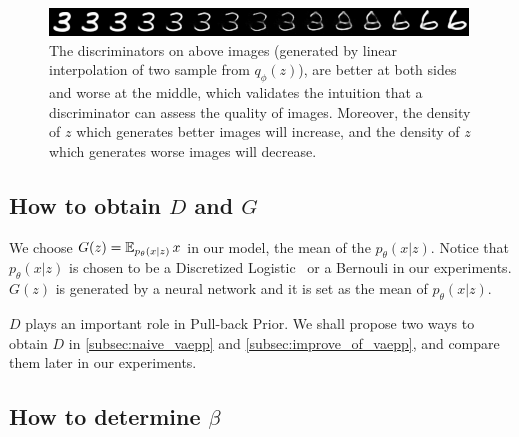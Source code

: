 \begin{figure}[tb]
	\centering
	\includegraphics[width=0.9\columnwidth]{../figures/interpolate}
	\caption{
	The discriminators on above images (generated by linear interpolation of two sample from $q_\phi(z)$), are better at both sides and worse at the middle, which validates the intuition that a discriminator can assess the quality of images. Moreover, the density of $z$ which generates better images will increase, and the density of $z$ which generates worse images will decrease. 
	}
	\label{fig:interpolate}
\end{figure}

\subsection{How to obtain $D$ and $G$}\label{subsec:determine_D_and_G}
We choose $G(z) = \operatorname{\mathbb{E}}_{p_\theta(x|z)} x$ in our model, \IE the mean of the $p_\theta(x|z)$. Notice that $p_\theta(x|z)$ is chosen to be a Discretized Logistic~\protect\cite{salimans2017pixelcnn++} or a Bernouli in our experiments. $G(z)$ is generated by a neural network and it is set as the mean of $p_\theta(x|z)$. 

$D$ plays an important role in Pull-back Prior. We shall propose two ways to obtain $D$ in \cref{subsec:naive_vaepp} and \cref{subsec:improve_of_vaepp}, and compare them later in our experiments. 

\subsection{How to determine $\beta$}\label{subsec:determine_beta}

